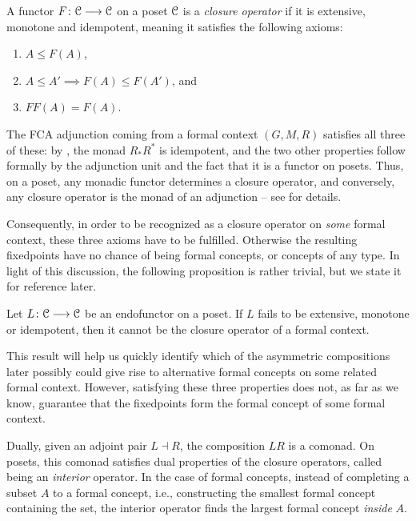 \begin{definition}
    A functor $F\colon \EuScript{C}\longrightarrow \EuScript{C}$ on a poset $\EuScript{C}$ is a \emph{closure operator} if it is extensive, monotone and idempotent, meaning it satisfies the following axioms:
\begin{enumerate}
    \item $A\leq F(A)$,
    \item $A\leq A' \implies F(A)\leq F(A')$, and
    \item $FF(A) = F(A)$.
\end{enumerate}
\end{definition}

The FCA adjunction coming from a formal context $(G,M,R)$ satisfies all three of these: by \cite[2.1.11]{jarvis_2025}, the monad $R_*R^*$ is idempotent, and the two other properties follow formally by the adjunction unit and the fact that it is a functor on posets. Thus, on a poset, any monadic functor determines a closure operator, and conversely, any closure operator is the monad of an adjunction -- see \cite[Chapter 7]{davey-priestley_2002} for details. 

Consequently, in order to be recognized as a closure operator on \emph{some} formal context, these three axioms have to be fulfilled. Otherwise the resulting fixedpoints have no chance of being formal concepts, or concepts of any type. In light of this discussion, the following proposition is rather trivial, but we state it for reference later.

\begin{proposition}
    \label{prop:axioms_for_closure}
    Let $L\colon \EuScript{C} \longrightarrow \EuScript{C}$ be an endofunctor on a poset. If $L$ fails to be extensive, monotone or idempotent, then it cannot be the closure operator of a formal context. 
\end{proposition}

This result will help us quickly identify which of the asymmetric compositions later possibly could give rise to alternative formal concepts on some related formal context. However, satisfying these three properties does not, as far as we know, guarantee that the fixedpoints form the formal concept of some formal context. 

\begin{remark}
    Dually, given an adjoint pair $L\dashv R$, the composition $LR$ is a comonad. On posets, this comonad satisfies dual properties of the closure operators, called being an \emph{interior} operator. In the case of formal concepts, instead of completing a subset $A$ to a formal concept, i.e., constructing the smallest formal concept containing the set, the interior operator finds the largest formal concept \emph{inside} $A$. 
\end{remark}


